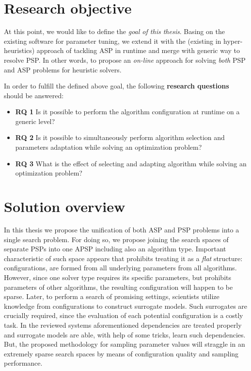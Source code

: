 \section{Research objective}\label{intro: research objective}
At this point, we would like to define the \emph{goal of this thesis}. Basing on the existing software for parameter tuning, we extend it with the (existing in hyper-heuristics) approach of tackling ASP in runtime and merge with generic way to resolve PSP. In other words, to propose an \emph{on-line} approach for solving \emph{both} PSP and ASP problems for heuristic solvers.

In order to fulfill the defined above goal, the following \textbf{research questions} should be answered:
\begin{itemize}
	\item \textbf{RQ 1} Is it possible to perform the algorithm configuration at runtime on a generic level?
	
	\item \textbf{RQ 2} Is it possible to simultaneously perform algorithm selection and parameters adaptation while solving an optimization problem?
	
	\item \textbf{RQ 3} What is the effect of selecting and adapting algorithm while solving an optimization problem?
\end{itemize}


\section{Solution overview}
In this thesis we propose the unification of both ASP and PSP problems into a single search problem. For doing so, we propose joining the search spaces of separate PSPs into one APSP including also an algorithm type. Important characteristic of such space appears that prohibits treating it as a \emph{flat} structure:  configurations, are formed from all underlying parameters from all algorithms. However, since one solver type requires its specific parameters, but prohibits parameters of other algorithms, the resulting configuration will happen to be sparse. Later, to perform a search of promising settings, scientists utilize knowledge from configurations to construct surrogate models. Such surrogates are crucially required, since the evaluation of each potential configuration is a costly task. In the reviewed systems aforementioned dependencies are treated properly and surrogate models are able, with help of some tricks, learn such dependencies. But, the proposed methodology for sampling parameter values will straggle in an extremely sparse search spaces by means of configuration quality and sampling performance.

